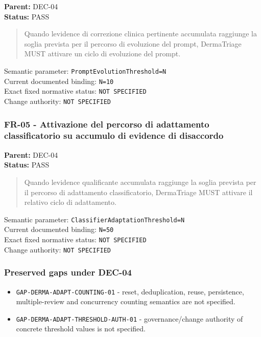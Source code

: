 \documentclass[11pt,a4paper]{article}
\providecommand{\tightlist}{\setlength{\itemsep}{0pt}\setlength{\parskip}{0pt}}
\begin{document}
\textbf{Parent:} DEC-04\\
\textbf{Status:} PASS

\begin{quote}
Quando l\textquotesingle evidence di correzione clinica pertinente
accumulata raggiunge la soglia prevista per il percorso di evoluzione
del prompt, DermaTriage MUST attivare un ciclo di evoluzione del prompt.
\end{quote}

Semantic parameter: \texttt{PromptEvolutionThreshold=N}\\
Current documented binding: \texttt{N=10}\\
Exact fixed normative status: \texttt{NOT\ SPECIFIED}\\
Change authority: \texttt{NOT\ SPECIFIED}

\subsubsection{FR-05 - Attivazione del percorso di adattamento
classificatorio su accumulo di evidence di
disaccordo}\label{fr-05---attivazione-del-percorso-di-adattamento-classificatorio-su-accumulo-di-evidence-di-disaccordo}

\textbf{Parent:} DEC-04\\
\textbf{Status:} PASS

\begin{quote}
Quando l\textquotesingle evidence qualificante accumulata raggiunge la
soglia prevista per il percorso di adattamento classificatorio,
DermaTriage MUST attivare il relativo ciclo di adattamento.
\end{quote}

Semantic parameter: \texttt{ClassifierAdaptationThreshold=N}\\
Current documented binding: \texttt{N=50}\\
Exact fixed normative status: \texttt{NOT\ SPECIFIED}\\
Change authority: \texttt{NOT\ SPECIFIED}

\subsubsection{Preserved gaps under
DEC-04}\label{preserved-gaps-under-dec-04}

\begin{itemize}
\tightlist
\item
  \texttt{GAP-DERMA-ADAPT-COUNTING-01} - reset, deduplication, reuse,
  persistence, multiple-review and concurrency counting semantics are
  not specified.
\item
  \texttt{GAP-DERMA-ADAPT-THRESHOLD-AUTH-01} - governance/change
  authority of concrete threshold values is not specified.
\end{itemize}
\end{document}
